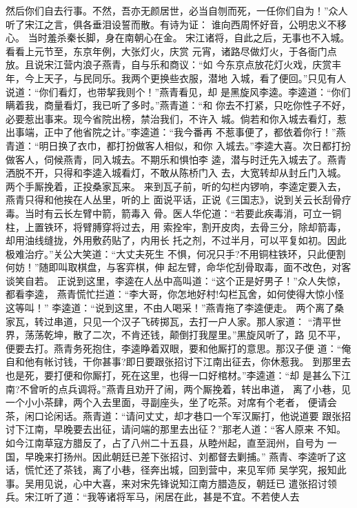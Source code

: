 然后你们自去行事。不然，吾亦无颜居世，必当自刎而死，一任你们自为！”众人
听了宋江之言，俱各垂泪设誓而散。有诗为证：
谁向西周怀好音，公明忠义不移心。
当时羞杀秦长脚，身在南朝心在金。
宋江诸将，自此之后，无事也不入城。看看上元节至，东京年例，大张灯火，庆赏
元宵，诸路尽做灯火，于各衙门点放。且说宋江营内浪子燕青，自与乐和商议：“如
今东京点放花灯火戏，庆赏丰年，今上天子，与民同乐。我两个更换些衣服，潜地
入城，看了便回。”只见有人说道：“你们看灯，也带挈我则个！”燕青看见，却
是黑旋风李逵。李逵道：“你们瞒着我，商量看灯，我已听了多时。”燕青道：“和
你去不打紧，只吃你性子不好，必要惹出事来。现今省院出榜，禁治我们，不许入
城。倘若和你入城去看灯，惹出事端，正中了他省院之计。”李逵道：“我今番再
不惹事便了，都依着你行！”燕青道：“明日换了衣巾，都打扮做客人相似，和你
入城去。”李逵大喜。次日都打扮做客人，伺候燕青，同入城去。不期乐和惧怕李
逵，潜与时迁先入城去了。燕青洒脱不开，只得和李逵入城看灯，不敢从陈桥门入
去，大宽转却从封丘门入城。两个手厮挽着，正投桑家瓦来。
来到瓦子前，听的勾栏内锣响，李逵定要入去，燕青只得和他挨在人丛里，听的上
面说平话，正说《三国志》，说到关云长刮骨疗毒。当时有云长左臂中箭，箭毒入
骨。医人华佗道：“若要此疾毒消，可立一铜柱，上置铁环，将臂膊穿将过去，用
索拴牢，割开皮肉，去骨三分，除却箭毒，却用油线缝拢，外用敷药贴了，内用长
托之剂，不过半月，可以平复如初。因此极难治疗。”关公大笑道：“大丈夫死生
不惧，何况只手?不用铜柱铁环，只此便割何妨！”随即叫取棋盘，与客弈棋，伸
起左臂，命华佗刮骨取毒，面不改色，对客谈笑自若。
正说到这里，李逵在人丛中高叫道：“这个正是好男子！”众人失惊，都看李逵，
燕青慌忙拦道：“李大哥，你怎地好村!勾栏瓦舍，如何使得大惊小怪这等叫！”
李逵道：“说到这里，不由人喝采！”燕青拖了李逵便走。
两个离了桑家瓦，转过串道，只见一个汉子飞砖掷瓦，去打一户人家。那人家道：
“清平世界，荡荡乾坤，散了二次，不肯还钱，颠倒打我屋里。”黑旋风听了，路
见不平，便要去打。燕青务死抱住，李逵睁着双眼，要和他厮打的意思。那汉子便
道：“俺自和他有帐讨钱，干你甚事?即日要跟张招讨下江南出征去，你休惹我。
到那里去也是死，要打便和你厮打，死在这里，也得一口好棺材。”李逵道：“却
是甚么下江南?不曾听的点兵调将。”燕青且劝开了闹，两个厮挽着，转出串道，
离了小巷，见一个小小茶肆，两个入去里面，寻副座头，坐了吃茶。对席有个老者，
便请会茶，闲口论闲话。燕青道：“请问丈丈，却才巷口一个军汉厮打，他说道要
跟张招讨下江南，早晚要去出征，请问端的那里去出征？”那老人道：“客人原来
不知。如今江南草寇方腊反了，占了八州二十五县，从睦州起，直至润州，自号为
一国，早晚来打扬州。因此朝廷已差下张招讨、刘都督去剿捕。”
燕青、李逵听了这话，慌忙还了茶钱，离了小巷，径奔出城，回到营中，来见军师
吴学究，报知此事。吴用见说，心中大喜，来对宋先锋说知江南方腊造反，朝廷已
遣张招讨领兵。宋江听了道：“我等诸将军马，闲居在此，甚是不宜。不若使人去
